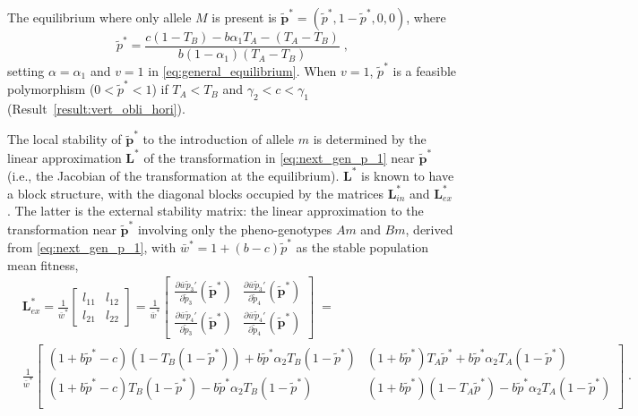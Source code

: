 \documentclass[12pt]{extarticle}
\let\vec\mathbf
\newcommand{\cl}{\mathbf{L}}
\begin{document}
\begin{appendices}
The equilibrium where only allele $M$ is present is  $\vec{\tilde{p}^*} = (\tilde{p}^*, 1-\tilde{p}^*, 0, 0)$, where
\begin{equation} \label{eq:p_tilde_star_alpha_1}
\tilde{p}^*=
\frac{c(1-T_B) - b \alpha_1 T_A - (T_A - T_B)}{b(1-\alpha_1)(T_A-T_B)} \;,
\end{equation}
setting $\alpha=\alpha_1$ and $v=1$ in \autoref{eq:general_equilibrium}.
When $v=1$, $\tilde p^*$ is a feasible polymorphism ($0 < \tilde{p}^* < 1$) if $T_A<T_B$ and $\gamma_2<c<\gamma_1$ (Result~\ref{result:vert_obli_hori}).

The local stability of $\vec{\tilde{p}^*}$ to the introduction of allele $m$ is determined by the linear approximation $\cl^*$ of the transformation in \autoref{eq:next_gen_p_1} near $\vec{\tilde{p}^*}$ (i.e., the Jacobian of the transformation at the equilibrium).
$\cl^*$ is known to have a block structure, with the diagonal blocks occupied by the matrices $\cl^*_{in}$ and $\cl^*_{ex}$ \citep{Liberman1986modifiers,Altenberg2017} .
The latter is the external stability matrix: the linear approximation to the transformation near $\vec{\tilde{p}^*}$ involving only the pheno-genotypes $Am$ and $Bm$, derived from \autoref{eq:next_gen_p_1}, with $\bar{w}^*=1+(b-c)\tilde{p}^*$ as the stable population mean fitness,
\begin{equation} \label{eq:external_stability_matrix}
\begin{aligned}
&\cl^*_{ex} = 
 \frac{1}{\bar{w}^*} \begin{bmatrix}
	 l_{1 1} &
	 l_{1 2} \\
	 l_{2 1} &
	 l_{2 2} 
\end{bmatrix} = 
\frac{1}{\bar{w}^*} \begin{bmatrix}
\frac{\partial\bar{w}\tilde{p}_3'}{\partial \tilde{p}_3}(\vec{\tilde{p}}^*) &
\frac{\partial\bar{w}\tilde{p}_3'}{\partial \tilde{p}_4}(\vec{\tilde{p}}^*) \\
\frac{\partial\bar{w}\tilde{p}_4'}{\partial \tilde{p}_3}(\vec{\tilde{p}}^*) &
\frac{\partial\bar{w}\tilde{p}_4'}{\partial \tilde{p}_4}(\vec{\tilde{p}}^*) 
\end{bmatrix} \;= \\
& \frac{1}{\bar{w}^*} \begin{bmatrix}
		(1+b \tilde{p}^* -c)(1-T_B(1-\tilde{p}^*)) + b \tilde{p}^* \alpha_2 T_B (1-\tilde{p}^*) & 
		(1+b \tilde{p}^*) T_A \tilde{p}^* + b \tilde{p}^* \alpha_2 T_A(1-\tilde{p}^*) \\
		(1+b \tilde{p}^* - c) T_B(1-\tilde{p}^*) - b \tilde{p}^* \alpha_2 T_B (1-\tilde{p}^*) &
		(1+b \tilde{p}^*) (1-T_A \tilde{p}^*) - b \tilde{p}^* \alpha_2 T_A (1-\tilde{p}^*) \\
  	\end{bmatrix} \;.
\end{aligned}
\end{equation}


\end{appendices}
\end{document}
